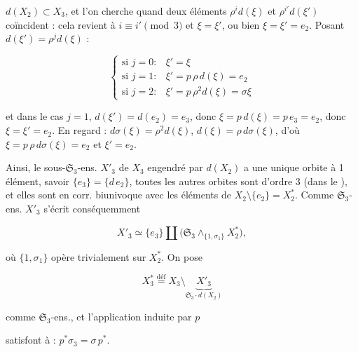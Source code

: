 \documentclass[11pt,a4paper]{article}
\begin{document}
$d(X_2) \subset X_3$, et l'on cherche quand deux éléments $\rho^i d(\xi)$ et
$\rho^{i'} d(\xi')$ coïncident : cela revient à $i \equiv i' \pmod 3$ et
$\xi = \xi'$, ou bien $\xi = \xi' = e_2$. Posant $d(\xi') = \rho^j d(\xi)$ :

\[
  \begin{cases}
    \text{si } j = 0 : & \xi' = \xi \\
    \text{si } j = 1 : & \xi' = p\,\rho\,d(\xi) = e_2 \\
    \text{si } j = 2 : & \xi' = p\,\rho^2 d(\xi) = \sigma\xi
  \end{cases}
\]

et dans le cas $j = 1$, $d(\xi') = d(e_2) = e_3$, donc
$\xi = p\,d(\xi) = p\,e_3 = e_2$, donc $\xi = \xi' = e_2$. En regard :
$d\sigma(\xi) = \rho^2 d(\xi)$, $d(\xi) = \rho\,d\sigma(\xi)$, d'où
$\xi = p\,\rho\,d\sigma(\xi) = e_2$ et $\xi' = e_2$.


Ainsi, le sous-$\mathfrak{S}_3$-ens. $X'_3$ de $X_3$ engendré par $d(X_2)$ a
une unique orbite à 1 élément, savoir $\{e_3\} = \{d\,e_2\}$, toutes les autres
orbites sont d'ordre 3 (dans le \ill), et elles sont en corr. biunivoque avec
les éléments de $X_2 \setminus \{e_2\} = X^{*}_2$. Comme
$\mathfrak{S}_3$-ens. $X'_3$ s'écrit conséquemment

\[
  X'_3 \simeq \{e_3\} \amalg
    \bigl(\mathfrak{S}_3 \wedge_{\{1,\sigma_1\}} X^{*}_2\bigr),
\]

où $\{1,\sigma_1\}$ opère trivialement sur $X^{*}_2$. On pose

\[
  X^{*}_3 \overset{\text{déf}}{=} X_3 \setminus
    \underbrace{X'_3}_{\mathfrak{S}_3\cdot d(X_2)}
\]

comme $\mathfrak{S}_3$-ens., et l'application induite par $p$


satisfont à : $\boxed{p^{*}\sigma_3 = \sigma\,p^{*}}$.

\marginal{\ill}

\end{document}
